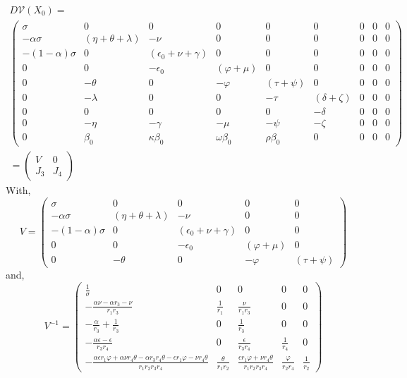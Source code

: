 \documentclass[fleqn,10pt]{wlscirep}
\begin{document}
\begin{equation}
\begin{split}
D \mathcal{V}(X_0) = \\
\begin{pmatrix}
\sigma & 0 & 0 & 0 & 0 & 0 &0 & 0 &0 \\
-\alpha \sigma & \left( \eta + \theta + \lambda\right)  & - \nu & 0 & 0 & 0 &0 & 0 &0 \\
-\left( 1- \alpha \right) \sigma & 0 & \left( \epsilon_0 + \nu + \gamma \right) & 0 & 0 & 0 &0 & 0 &0 \\
0 & 0 & - \epsilon_0 & \left( \varphi + \mu\right)  & 0 & 0 &0 & 0 &0 \\
0 & -\theta & 0 & -\varphi & \left( \tau + \psi\right)  & 0 &0 & 0 &0 \\
0 & -\lambda & 0 & 0 & -\tau & \left( \delta + \zeta\right)  &0 & 0 &0 \\
0 & 0 & 0 & 0 & 0 & -\delta &0 & 0 &0 \\
0 & -\eta & -\gamma & -\mu & -\psi & -\zeta &0 & 0 &0 \\
0 & \beta_0 & \kappa\beta_0 & \omega\beta_0 & \rho\beta_0 & 0 &0 & 0 &0
  \end{pmatrix}\\
  =\begin{pmatrix}
  V & 0\\
  J_3 & J_4
  \end{pmatrix}
\end{split}
\label{eqn:DFE-3}
\end{equation}
%
%
With,
%
%
\begin{equation}
V = \begin{pmatrix}
\sigma & 0 & 0 & 0 & 0\\
-\alpha \sigma & \left( \eta + \theta + \lambda\right)  & - \nu & 0 & 0\\
-\left( 1- \alpha \right) \sigma & 0 & \left( \epsilon_0 + \nu + \gamma \right) & 0 & 0\\
0 & 0 & - \epsilon_0 & \left( \varphi + \mu\right)  & 0\\
0 & -\theta & 0 & -\varphi & \left( \tau + \psi\right)
\end{pmatrix}
\label{eqn:DFE-4}
\end{equation}
%
%
and,
%
%
\begin{equation}
V^{-1} = 
\begin{pmatrix}
\frac{1}{\sigma} & 0 & 0 & 0 & 0\\
- \frac{\alpha \nu - \alpha r_{3} - \nu}{r_{1} r_{3}} & \frac{1}{r_{1}} & \frac{\nu}{r_{1} r_{3}} & 0 & 0\\
- \frac{\alpha}{r_{3}} + \frac{1}{r_{3}} & 0 & \frac{1}{r_{3}} & 0 & 0\\
- \frac{\alpha \epsilon - \epsilon}{r_{3} r_{4}} & 0 & \frac{\epsilon}{r_{3} r_{4}} & \frac{1}{r_{4}} & 0\\
- \frac{\alpha \epsilon r_{1} \varphi + \alpha \nu r_{4} \theta - \alpha r_{3} r_{4} \theta - \epsilon r_{1} \varphi - \nu r_{4} \theta}{r_{1} r_{2} r_{3} r_{4}} & \frac{\theta}{r_{1} r_{2}} & \frac{\epsilon r_{1} \varphi + \nu r_{4} \theta}{r_{1} r_{2} r_{3} r_{4}} & \frac{\varphi}{r_{2} r_{4}} & \frac{1}{r_{2}}
\end{pmatrix}
\label{eqn:DFE-5}
\end{equation}
\end{document}
